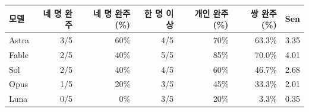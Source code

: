 \begin{tabular}{@{}lrrrrrr@{}}
\toprule
모델 & 네 명 완주 & 네 명 완주(\%) & 한 명 이상 & 개인 완주(\%) & 쌍 완주(\%) & Sen \\
\midrule
Astra & 3/5 & 60\% & 4/5 & 70\% & 63.3\% & 3.35 \\
Fable & 2/5 & 40\% & 5/5 & 85\% & 70.0\% & 4.01 \\
Sol & 2/5 & 40\% & 4/5 & 60\% & 46.7\% & 2.68 \\
Opus & 1/5 & 20\% & 3/5 & 45\% & 33.3\% & 2.01 \\
Luna & 0/5 & 0\% & 3/5 & 20\% & 3.3\% & 0.35 \\
\bottomrule
\end{tabular}
